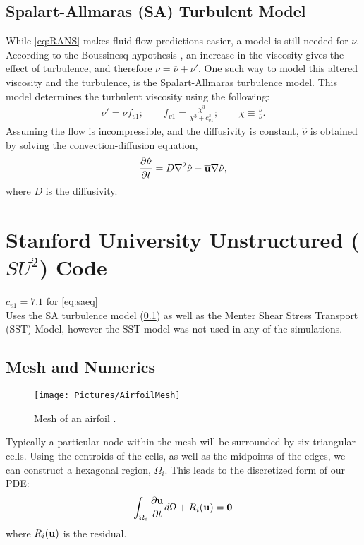\documentclass[10pt, titlepage]{article}
\begin{document}
\subsection{Spalart-Allmaras (SA) Turbulent Model}\label{subsec:saturb}
While \eqref{eq:RANS} makes fluid flow predictions easier, a model is still needed for $\nu$. According to the Boussinesq hypothesis \cite{Boussinesq}, an increase in the viscosity gives the effect of turbulence, and therefore $\nu = \overline{\nu} + \nu'$. One such way to model this altered viscosity and the turbulence, is the Spalart-Allmaras turbulence model. This model determines the turbulent viscosity using the following:
\begin{align}
\nu' = \hat{\nu} f_{v1}; \qquad f_{v1} = \frac{\chi^3}{\chi^3+c_{v1}^3}; \qquad \chi \equiv \frac{\hat{\nu}}{\overline{\nu}}.
\label{eq:saeq}
\end{align}
Assuming the flow is incompressible, and the diffusivity is constant, $\hat{\nu}$ is obtained by solving the convection-diffusion equation,
\begin{align*}
\frac{\partial \hat{\nu}}{\partial t} = D \nabla^2 \hat{\nu} - \overline{\bf{u}} \nabla \hat{\nu},
\end{align*}
where $D$ is the diffusivity.

\section{Stanford University Unstructured ($SU^2$) Code}
$c_{v1} = 7.1$ for \eqref{eq:saeq} \\

Uses the SA turbulence model (\ref{subsec:saturb}) as well as the Menter Shear Stress Transport (SST) Model, however the SST model was not used in any of the simulations.

\lipsum[1-2]

\subsection{Mesh and Numerics}

\begin{wrapfigure}{R}{0.5\textwidth}
\centering
\texttt{[image: Pictures/AirfoilMesh]}
\caption[Mesh of an Airfoil]{Mesh of an airfoil \cite{mesh}.}
\label{fig:airfoilmesh}
\end{wrapfigure}

Typically a particular node within the mesh will be surrounded by six triangular cells. Using the centroids of the cells, as well as the midpoints of the edges, we can construct a hexagonal region, $\Omega_i$. This leads to the discretized form of our PDE:
\begin{equation*}
\int_{\Omega_i} \frac{\partial \bf{u}}{\partial t} d\Omega + R_i(\bf{u}) = 0
\end{equation*}
where $R_i(\bf{u})$ is the residual.
\end{document}
